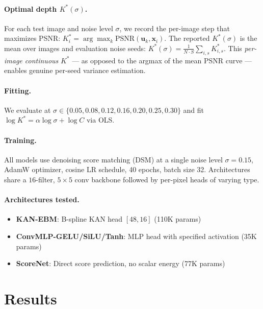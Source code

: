 \documentclass[letterpaper]{article}
\newcommand{\xx}{\mathbf{x}}
\newcommand{\uu}{\mathbf{u}}
\begin{document}
\paragraph{Optimal depth $K^*(\sigma)$.}
For each test image and noise level $\sigma$, we record the
per-image step that maximizes PSNR: $K^*_i = \arg\max_k \text{PSNR}(\uu_k, \xx_i)$.
The reported $K^*(\sigma)$ is the mean over images and evaluation
noise seeds: $K^*(\sigma) = \frac{1}{N\cdot S}\sum_{i,s} K^*_{i,s}$.
This \emph{per-image continuous} $K^*$ --- as opposed to the argmax
of the mean PSNR curve --- enables genuine per-seed variance estimation.

\paragraph{Fitting.}
We evaluate at $\sigma \in \{0.05, 0.08, 0.12, 0.16, 0.20, 0.25, 0.30\}$
and fit $\log K^* = \alpha \log\sigma + \log C$ via OLS.

\paragraph{Training.}
All models use denoising score matching (DSM) at a single noise level
$\sigma{=}0.15$, AdamW optimizer, cosine LR schedule, 40 epochs,
batch size 32.
Architectures share a $16$-filter, $5{\times}5$ conv backbone
followed by per-pixel heads of varying type.

\paragraph{Architectures tested.}
\begin{itemize}[leftmargin=*,topsep=2pt,itemsep=1pt]
\item \textbf{KAN-EBM}: B-spline KAN head $[48, 16]$ (110K params)
\item \textbf{ConvMLP-GELU/SiLU/Tanh}: MLP head with specified activation (35K params)
\item \textbf{ScoreNet}: Direct score prediction, no scalar energy (77K params)
\end{itemize}

\section{Results}
\label{sec:results}
\end{document}
